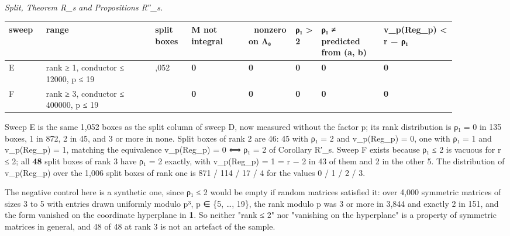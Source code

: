 \documentclass[11pt,a4paper]{article}
\theoremstyle{named}
\begin{document}
\textit{Split, Theorem R\_s and Propositions R″\_s.}

\begin{center}\begin{small}
\begin{tabular}{>{\raggedright\arraybackslash}p{0.071\linewidth}>{\raggedright\arraybackslash}p{0.21\linewidth}>{\raggedright\arraybackslash}p{0.071\linewidth}>{\raggedright\arraybackslash}p{0.114\linewidth}>{\raggedright\arraybackslash}p{0.099\linewidth}>{\raggedright\arraybackslash}p{0.053\linewidth}>{\raggedright\arraybackslash}p{0.128\linewidth}>{\raggedright\arraybackslash}p{0.142\linewidth}}
\hline
sweep & range & split boxes & M not integral &  nonzero on Λ₀ & ρ₁ \textgreater{} 2 & ρ₁ ≠ predicted from (a, b) & v\_p(Reg\_p) \textless{} r − ρ₁ \\
\hline
E & rank ≥ 1, conductor ≤ 12000, p ≤ 19 & 1,052 & \textbf{0} & \textbf{0} & \textbf{0} & \textbf{0} & \textbf{0} \\
F & rank ≥ 3, conductor ≤ 400000, p ≤ 19 & 48 & \textbf{0} & \textbf{0} & \textbf{0} & \textbf{0} & \textbf{0} \\
\hline
\end{tabular}
\end{small}\end{center}

Sweep E is the same 1,052 boxes as the split column of sweep D, now measured without the factor p; its rank distribution is ρ₁ = 0 in 135 boxes, 1 in 872, 2 in 45, and 3 or more in none. Split boxes of rank 2 are 46: 45 with ρ₁ = 2 and v\_p(Reg\_p) = 0, one with ρ₁ = 1 and v\_p(Reg\_p) = 1, matching the equivalence v\_p(Reg\_p) = 0 ⟺ ρ₁ = 2 of Corollary R′\_s. Sweep F exists because ρ₁ ≤ 2 is vacuous for r ≤ 2; all \textbf{48} split boxes of rank 3 have ρ₁ = 2 exactly, with v\_p(Reg\_p) = 1 = r − 2 in 43 of them and 2 in the other 5. The distribution of v\_p(Reg\_p) over the 1,006 split boxes of rank one is 871 / 114 / 17 / 4 for the values 0 / 1 / 2 / 3.

The negative control here is a synthetic one, since ρ₁ ≤ 2 would be empty if random matrices satisfied it: over 4,000 symmetric matrices of sizes 3 to 5 with entries drawn uniformly modulo p³, p ∈ \{5, …, 19\}, the rank modulo p was 3 or more in 3,844 and exactly 2 in 151, and the form vanished on the coordinate hyperplane in \textbf{1}. So neither "rank ≤ 2" nor "vanishing on the hyperplane" is a property of symmetric matrices in general, and 48 of 48 at rank 3 is not an artefact of the sample.
\end{document}
